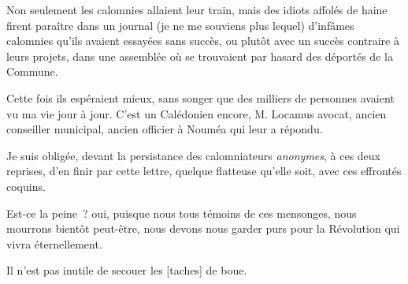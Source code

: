 \documentclass[french,twoside]{book} %
\newcommand\corr[1]{#1}
\begin{document}
\noindent Non seulement les calomnies allaient leur train, mais des idiots affolés de haine firent paraître dans un journal (je ne me souviens plus lequel) d’infâmes calomnies qu’ils avaient essayées sans succès, ou plutôt avec un succès contraire à leurs projets, dans une assemblée où se trouvaient par hasard des déportés de la Commune.\par
Cette fois ils espéraient mieux, sans songer que des milliers de personnes avaient vu ma vie jour à jour. C’est un Calédonien encore, M. Locamus avocat, ancien conseiller municipal, ancien officier à Nouméa qui leur a répondu.\par
Je suis obligée, devant la persistance des calomniateurs \emph{anonymes}, à ces deux reprises, d’en finir par cette lettre, quelque flatteuse qu’elle soit, avec ces effrontés coquins.\par
 Est-ce la peine ? oui, puisque nous tous témoins de ces mensonges, nous mourrons bientôt peut-être, nous devons nous garder purs pour la Révolution qui vivra éternellement.\par
Il n’est pas inutile de secouer les [{\corr taches}] de boue.\par
\end{document}
